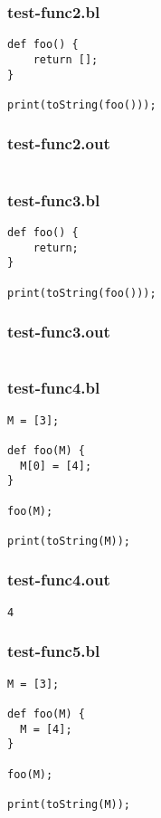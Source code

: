 \subsubsection{test-func2.bl}
\begin{lstlisting}
def foo() {
    return [];
}

print(toString(foo()));\end{lstlisting}
\subsubsection{test-func2.out}
\begin{lstlisting}
\end{lstlisting}
\subsubsection{test-func3.bl}
\begin{lstlisting}
def foo() {
    return;
}

print(toString(foo()));
\end{lstlisting}
\subsubsection{test-func3.out}
\begin{lstlisting}
\end{lstlisting}
\subsubsection{test-func4.bl}
\begin{lstlisting}
M = [3];

def foo(M) {
  M[0] = [4];
}

foo(M);

print(toString(M));
\end{lstlisting}
\subsubsection{test-func4.out}
\begin{lstlisting}
4
\end{lstlisting}
\subsubsection{test-func5.bl}
\begin{lstlisting}
M = [3];

def foo(M) {
  M = [4];
}

foo(M);

print(toString(M));
\end{lstlisting}
